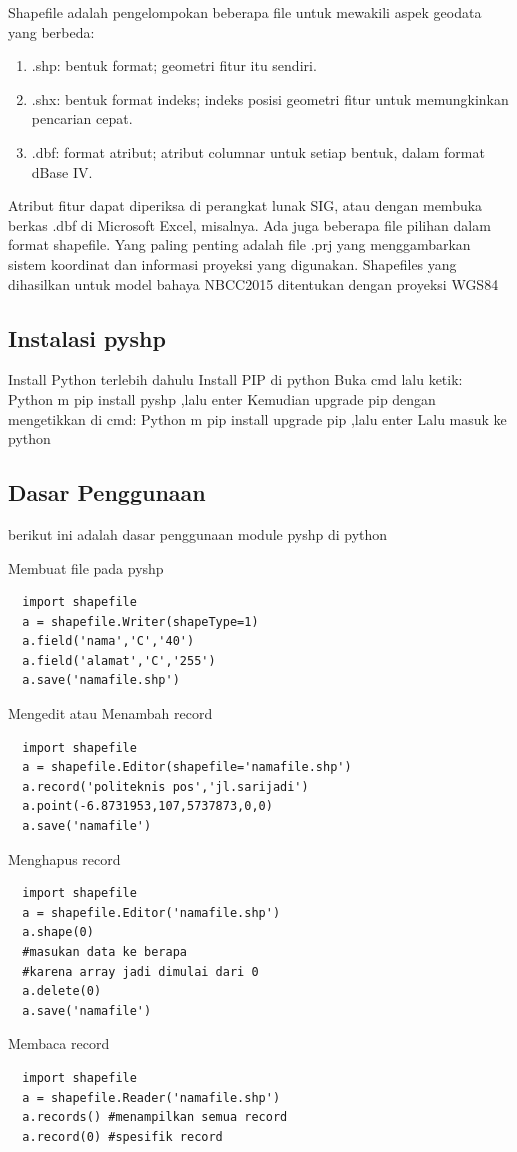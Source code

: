 Shapefile adalah pengelompokan beberapa file untuk mewakili aspek geodata yang berbeda:
\begin{enumerate}
	\item .shp: bentuk format; geometri fitur itu sendiri.
	\item .shx: bentuk format indeks; indeks posisi geometri fitur untuk memungkinkan pencarian cepat.
	\item .dbf: format atribut; atribut columnar untuk setiap bentuk, dalam format dBase IV.
\end{enumerate}
Atribut fitur dapat diperiksa di perangkat lunak SIG, atau dengan membuka berkas .dbf di Microsoft Excel, misalnya. Ada juga beberapa file pilihan dalam format shapefile. Yang paling penting adalah file .prj yang menggambarkan sistem koordinat dan informasi proyeksi yang digunakan. Shapefiles yang dihasilkan untuk model bahaya NBCC2015 ditentukan dengan proyeksi WGS84

\subsection{Instalasi pyshp}
Install Python terlebih dahulu
Install PIP di python
Buka cmd lalu ketik: Python m pip install pyshp ,lalu enter
Kemudian upgrade pip dengan mengetikkan di cmd: Python m pip install upgrade pip ,lalu enter
Lalu masuk ke python

\subsection{Dasar Penggunaan}
berikut ini adalah dasar penggunaan module pyshp di python

Membuat file pada pyshp
  \begin{verbatim}
  import shapefile
  a = shapefile.Writer(shapeType=1)
  a.field('nama','C','40')
  a.field('alamat','C','255')
  a.save('namafile.shp')
  \end{verbatim}

Mengedit atau Menambah record
\begin{verbatim}
  import shapefile
  a = shapefile.Editor(shapefile='namafile.shp')
  a.record('politeknis pos','jl.sarijadi')
  a.point(-6.8731953,107,5737873,0,0)
  a.save('namafile')
\end{verbatim}

Menghapus record
\begin{verbatim}
  import shapefile
  a = shapefile.Editor('namafile.shp')
  a.shape(0) 
  #masukan data ke berapa 
  #karena array jadi dimulai dari 0
  a.delete(0)
  a.save('namafile')
\end{verbatim}

Membaca record
\begin{verbatim}
  import shapefile
  a = shapefile.Reader('namafile.shp')
  a.records() #menampilkan semua record
  a.record(0) #spesifik record
\end{verbatim}






